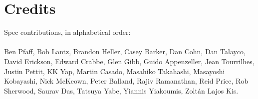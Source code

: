 \section{Credits}

Spec contributions, in alphabetical order:
\\\\
Ben Pfaff,
Bob Lantz,
Brandon Heller,
Casey Barker,
Dan Cohn,
Dan Talayco,
David Erickson,
Edward Crabbe,
Glen Gibb,
Guido Appenzeller,
Jean Tourrilhes,
Justin Pettit,
KK Yap,
Martin Casado,
Masahiko Takahashi,
Masayoshi Kobayashi,
Nick McKeown,
Peter Balland,
Rajiv Ramanathan,
Reid Price,
Rob Sherwood,
Saurav Das,
Tatsuya Yabe,
Yiannis Yiakoumis,
Zoltán Lajos Kis.
